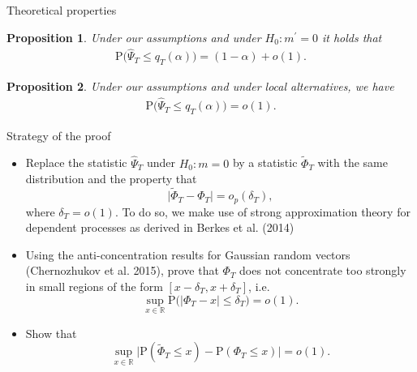 \documentclass[10pt]{beamer}
\newcommand{\Prob}{\mathrm{P}}
\newtheorem{prop}{Proposition}
\begin{document}
\begin{frame}{Theoretical properties}
\begin{prop}\label{prop-shape-1}
Under our assumptions and under $H_0: m^{\prime}= 0$ it holds that 
\vspace{-3mm}
\begin{align*}
\Prob \big( \widehat{\Psi}_T \le q_T(\alpha) \big) = (1 - \alpha) + o(1).
\end{align*}
\end{prop}\pause
\begin{prop}\label{prop-shape-2}
Under our assumptions and under local alternatives, we have 
\vspace{-3mm}
\begin{align*}
\Prob \big( \widehat{\Psi}_T \le q_T(\alpha) \big) = o(1).
\end{align*}
\end{prop}
\end{frame}


\begin{frame}{Strategy of the proof}
\begin{itemize}
\item Replace the statistic $\widehat{\Psi}_T$ under $H_0: m = 0$ by a statistic $\widetilde{\Phi}_T$ with the same distribution and the property that 
\begin{equation*}\label{eq-theo-stat-strategy-step1}
\big| \widetilde{\Phi}_T - \Phi_T \big| = o_p(\delta_T),
\end{equation*}
where $\delta_T = o(1)$. To do so, we make use of strong approximation theory for dependent processes as derived in Berkes et al. (2014)\pause
\vspace{2mm}
\item Using the anti-concentration results for Gaussian random vectors (Chernozhukov et al. 2015), prove that $\Phi_T$ does not concentrate too strongly in small regions of the form $[x-\delta_T,x+\delta_T]$, i.e.
\begin{equation*}\label{eq-theo-stat-strategy-step2}
\sup_{x \in \mathbb{R}} \Prob \big( |\Phi_T - x| \le \delta_T \big) = o(1).
\end{equation*}\pause
\vspace{-2mm}
\item Show that 
\begin{equation*}\label{eq-theo-stat-strategy-claim}
\sup_{x \in \mathbb{R}} \big| \Prob(\widetilde{\Phi}_T \le x) - \Prob(\Phi_T \le x) \big| = o(1). 
\end{equation*}
\end{itemize}
\end{frame}
\end{document}
